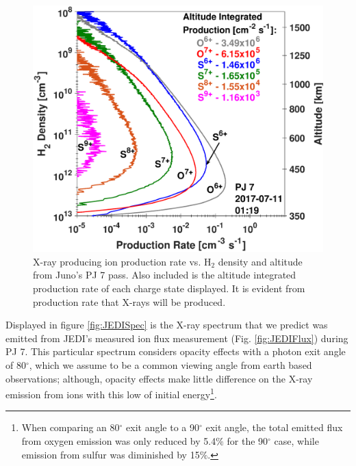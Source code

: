 \documentclass[draft]{agujournal2018}
\begin{document}
\begin{figure}[ht]
    \centering
    \includegraphics[width=\textwidth]{Figures/PJ7IonProd.eps}
    \caption{X-ray producing ion production rate vs. H$_2$ density and altitude from Juno's PJ 7 pass. Also included is the altitude integrated production rate of each charge state displayed. It is evident from production rate that X-rays will be produced.}
    \label{fig:JEDIIonProd}
\end{figure}

Displayed in figure \ref{fig:JEDISpec} is the X-ray spectrum that we predict was emitted from JEDI's measured ion flux measurement (Fig. \ref{fig:JEDIFlux}) during PJ 7.
This particular spectrum considers opacity effects with a photon exit angle of 80$^{\circ}$, which we assume to be a common viewing angle from earth based observations; although, opacity effects make little difference on the X-ray emission from ions with this low of initial energy\footnote{When comparing an 80$^{\circ}$ exit angle to a 90$^{\circ}$ exit angle, the total emitted flux from oxygen emission was only reduced by 5.4$\%$ for the 90$^{\circ}$ case, while emission from sulfur was diminished by 15$\%$.}.
\end{document}
